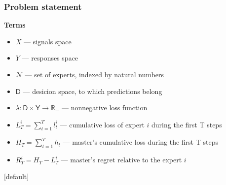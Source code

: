 \begin{frame}
\frametitle{Problem statement}

\textbf{Terms}
\begin{itemize}
\item $X$ --- signals space
\item $Y$ --- responses space
\item $\mathcal{N}$ --- set of experts, indexed by natural numbers \\
\item $\mathsf{D}$ --- desicion space, to which predictions belong \\
\item $\lambda: \mathsf{D} \times \mathsf{Y} \rightarrow \mathbb{R}_+$ --- nonnegative loss function \\

\item $L^i_T = \sum\limits_{t = 1}^T l^i_t$ --- cumulative loss of expert $i$ during the first T steps \\
\item $H_T = \sum\limits_{t = 1}^T h_t$ --- master's cumulative loss during the first T steps \\
\item $R^i_T = H_T - L^i_T$ --- master's regret relative to the expert $i$ \\

\end{itemize}


\end{frame}


[default]
